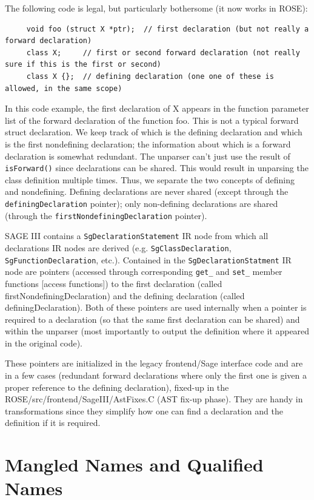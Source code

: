 The following code is legal, but particularly bothersome (it now works in ROSE):
{\indent
{\mySmallFontSize
\begin{verbatim}
     void foo (struct X *ptr);  // first declaration (but not really a forward declaration)
     class X;     // first or second forward declaration (not really sure if this is the first or second)
     class X {};  // defining declaration (one one of these is allowed, in the same scope)
\end{verbatim}
}}
   In this code example, the first declaration of X appears in the function parameter
list of the forward declaration of the function foo. This is not a typical forward 
struct declaration.  We keep track of which is the 
defining declaration and which is the first nondefining declaration; the information
about which is a forward declaration is somewhat redundant.  The unparser can't just 
use the result of {\tt isForward()} since declarations can be shared. This would
result in unparsing the class definition multiple times.  Thus, we separate
the two concepts of defining and nondefining. Defining declarations are never shared
(except through the {\tt definingDeclaration} pointer); only non-defining declarations
are shared (through the {\tt firstNondefiningDeclaration} pointer).

    SAGE III contains a {\tt SgDeclarationStatement} IR node from which all declarations IR nodes
are derived (e.g. {\tt SgClassDeclaration}, {\tt SgFunctionDeclaration}, etc.).  Contained in the
{\tt SgDeclarationStatment} IR node are pointers (accessed through corresponding {\tt get\_} and
{\tt set\_} member functions [access functions]) to the first declaration (called
firstNondefiningDeclaration) and the defining declaration (called
definingDeclaration).  Both of these pointers are used internally when a pointer is
required to a declaration (so that the same first declaration can be shared)
and within the unparser (most importantly to output the definition where it
appeared in the original code).

   These pointers are initialized in the legacy frontend/Sage interface code and are in a few cases
(redundant forward declarations where only the first one is given a proper reference to
the defining declaration), fixed-up in the ROSE/src/frontend/SageIII/AstFixes.C (AST fix-up
phase). They are handy in transformations since they simplify how one can find a
declaration and the definition if it is required.

\section{Mangled Names and Qualified Names}

